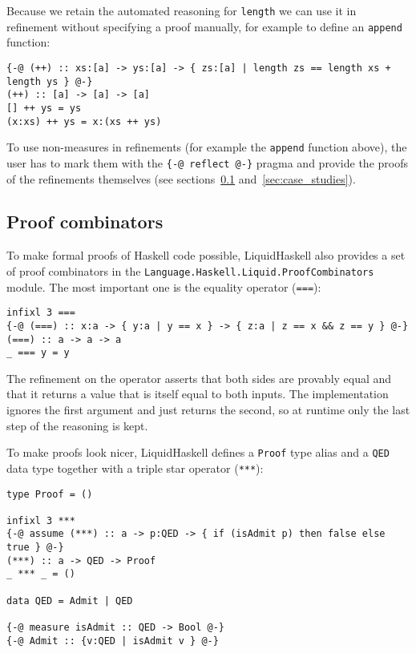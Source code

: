 \documentclass[acmlarge,screen,authorversion=true,nonacm=true]{acmart}
\begin{document}
Because we retain the automated reasoning for \texttt{length} we can use it in refinement without specifying a proof manually, for example to define an \texttt{append} function:

\begin{lstlisting}
{-@ (++) :: xs:[a] -> ys:[a] -> { zs:[a] | length zs == length xs + length ys } @-}
(++) :: [a] -> [a] -> [a]
[] ++ ys = ys
(x:xs) ++ ys = x:(xs ++ ys)
\end{lstlisting}

To use non-measures in refinements (for example the \texttt{append} function above), the user has to mark them with the \texttt{\{-@ reflect @-\}} pragma and provide the proofs of the refinements themselves (see sections~\ref{sec:proof_combinators} and~\ref{sec:case_studies}).

\subsection{Proof combinators}\label{sec:proof_combinators}

To make formal proofs of Haskell code possible, LiquidHaskell also provides a set of proof combinators in the \texttt{Language.Haskell.Liquid.ProofCombinators} module. The most important one is the equality operator (\texttt{===}):

\begin{lstlisting}
infixl 3 ===
{-@ (===) :: x:a -> { y:a | y == x } -> { z:a | z == x && z == y } @-}
(===) :: a -> a -> a
_ === y = y
\end{lstlisting}
The refinement on the operator asserts that both sides are provably equal and that it returns a value that is itself equal to both inputs. The implementation ignores the first argument and just returns the second, so at runtime only the last step of the reasoning is kept.

To make proofs look nicer, LiquidHaskell defines a \texttt{Proof} type alias and a \texttt{QED} data type together with a triple star operator (\texttt{***}):
\begin{lstlisting}
type Proof = ()

infixl 3 ***
{-@ assume (***) :: a -> p:QED -> { if (isAdmit p) then false else true } @-}
(***) :: a -> QED -> Proof
_ *** _ = ()

data QED = Admit | QED

{-@ measure isAdmit :: QED -> Bool @-}
{-@ Admit :: {v:QED | isAdmit v } @-}
\end{lstlisting}
\end{document}
